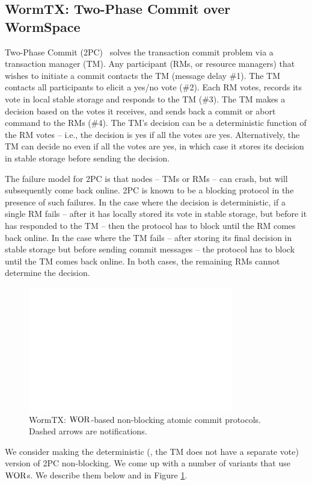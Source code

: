 \subsection{WormTX: Two-Phase Commit over WormSpace}
\label{chapter:wormspace:subsec:wormtx}

Two-Phase Commit (2PC)~\cite{distsys} solves the transaction commit problem via a transaction manager (TM). 
Any participant (RMs, or resource managers) that wishes to initiate a commit contacts the TM (message delay \#1). 
The TM contacts all participants to elicit a yes/no vote (\#2). Each RM votes, records its vote in local stable storage and responds to the TM (\#3). 
The TM makes a decision based on the votes it receives, and sends back a commit or abort command to the RMs (\#4). 
The TM's decision can be a deterministic function of the RM votes -- i.e., the decision is yes if all the votes are yes. 
Alternatively, the TM can decide no even if all the votes are yes, in which case it stores its decision in stable storage before sending the decision.

The failure model for 2PC is that nodes -- TMs or RMs -- can crash, but will subsequently come back online. 
2PC is known to be a blocking protocol in the presence of such failures. In the case where the decision is deterministic, 
if a single RM fails -- after it has locally stored its vote in stable storage, but before it has responded to the 
TM -- then the protocol has to block until the RM comes back online. In the case where the TM fails --
 after storing its final decision in stable storage but before sending commit messages -- 
 the protocol has to block until the TM comes back online. In both cases, the remaining RMs cannot determine the decision. 
 
\begin{figure}
\centering
\includegraphics[width=0.8\textwidth, page=5]{figs/multipaxos/pics-longer}
\caption{WormTX: $\mathrm{WOR}$-based non-blocking atomic commit protocols. Dashed arrows are notifications.}
\label{fig:chapter:multipaxos:commit}
\end{figure}
We consider making the deterministic (\ie, the TM does not have a separate vote) version of 2PC non-blocking. 
We come up with a number of variants that use $\mathrm{WOR}$s. We describe them below and in Figure \ref{fig:chapter:multipaxos:commit}.

